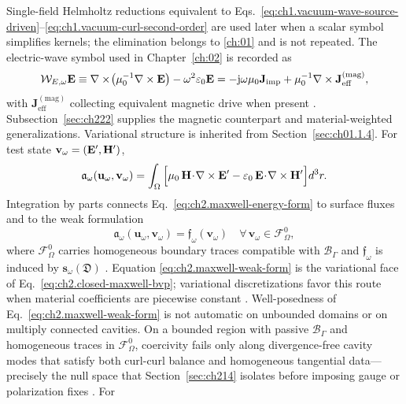 Single-field Helmholtz reductions equivalent to
Eqs.~\eqref{eq:ch1.vacuum-wave-source-driven}--\eqref{eq:ch1.vacuum-curl-second-order}
are used later when a scalar symbol simplifies kernels; the elimination belongs to
\ref{ch:01} and is not repeated. The electric-wave symbol used in
Chapter~\ref{ch:02} is recorded as
\begin{equation}
\label{eq:ch2.electric-wave-operator}
\mathcal{W}_{E,\omega}\mathbf{E}\equiv
\nabla\times\!\left(\mu_0^{-1}\nabla\times\mathbf{E}\right)-\omega^2\varepsilon_0\mathbf{E}
= -\mathrm{j}\omega\mu_0\mathbf{J}_{\mathrm{imp}}+\mu_0^{-1}\nabla\times\mathbf{J}^{\mathrm{(mag)}}_{\mathrm{eff}},
\end{equation}
with \(\mathbf{J}^{\mathrm{(mag)}}_{\mathrm{eff}}\) collecting equivalent magnetic
drive when present \cite{stratton1941}. Subsection~\ref{sec:ch222} supplies the
magnetic counterpart and material-weighted generalizations. Variational structure is inherited from Section~\ref{sec:ch01.1.4}. For test state
\(\mathbf{v}_\omega=(\mathbf{E}',\mathbf{H}')\),
\begin{equation}
\label{eq:ch2.maxwell-energy-form}
\mathfrak{a}_\omega(\mathbf{u}_\omega,\mathbf{v}_\omega)=
\int_\Omega\Big[\mu_0\,\mathbf{H}\!\cdot\!\nabla\times\mathbf{E}'-\varepsilon_0\,\mathbf{E}\!\cdot\!\nabla\times\mathbf{H}'\Big]d^{3}r.
\end{equation}
Integration by parts connects Eq.~\eqref{eq:ch2.maxwell-energy-form} to surface
fluxes and to the weak formulation
\begin{equation}
\label{eq:ch2.maxwell-weak-form}
\mathfrak{a}_\omega(\mathbf{u}_\omega,\mathbf{v}_\omega)=\mathfrak{f}_\omega(\mathbf{v}_\omega)
\quad\forall\,\mathbf{v}_\omega\in\mathcal{F}_\Omega^{0},
\end{equation}
where \(\mathcal{F}_\Omega^{0}\) carries homogeneous boundary traces compatible with
\(\mathcal{B}_\Gamma\) and \(\mathfrak{f}_\omega\) is induced by
\(\mathbf{s}_\omega(\mathfrak{D})\) \cite{poynting1884}. Equation
\eqref{eq:ch2.maxwell-weak-form} is the variational face of
Eq.~\eqref{eq:ch2.closed-maxwell-bvp}; variational discretizations favor this
route when material coefficients are piecewise constant
\cite{harrington2001}.
Well-posedness of Eq.~\eqref{eq:ch2.maxwell-weak-form} is not automatic on
unbounded domains or on multiply connected cavities. On a bounded region with
passive \(\mathcal{B}_\Gamma\) and homogeneous traces in
\(\mathcal{F}_\Omega^{0}\), coercivity fails only along divergence-free
cavity modes that satisfy both curl-curl balance and homogeneous tangential
data---precisely the null space that Section~\ref{sec:ch214} isolates before
imposing gauge or polarization fixes \cite{harrington2001}. For
